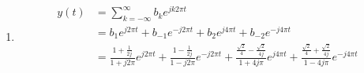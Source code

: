 \documentclass[10pt,a4paper, margin=1in]{article}
\begin{document}
\begin{enumerate}
\begin{enumerate}
    \item %
    \begin{align*}
        y(t) & = \sum_{k=-\infty}^{\infty} b_k e^{jk2\pi t} \\
        & = b_1 e^{j2\pi t} + b_{-1} e^{-j2\pi t} + b_2 e^{j4\pi  t} + b_{-2} e^{-j4\pi  t} \\
        & = \frac{1 + \frac{1}{2j}}{1 + j2\pi } e^{j2\pi t} + \frac{1 - \frac{1}{2j}}{1 - j2\pi } e^{-j2\pi t} + \frac{\frac{\sqrt{2}}{4} - \frac{\sqrt{2}}{4j}}{1 + 4j\pi } e^{j4\pi  t} + \frac{\frac{\sqrt{2}}{4} + \frac{\sqrt{2}}{4j}}{1 - 4j\pi } e^{-j4\pi  t} \\
    \end{align*}
    \end{enumerate}


\end{enumerate}
\end{document}
